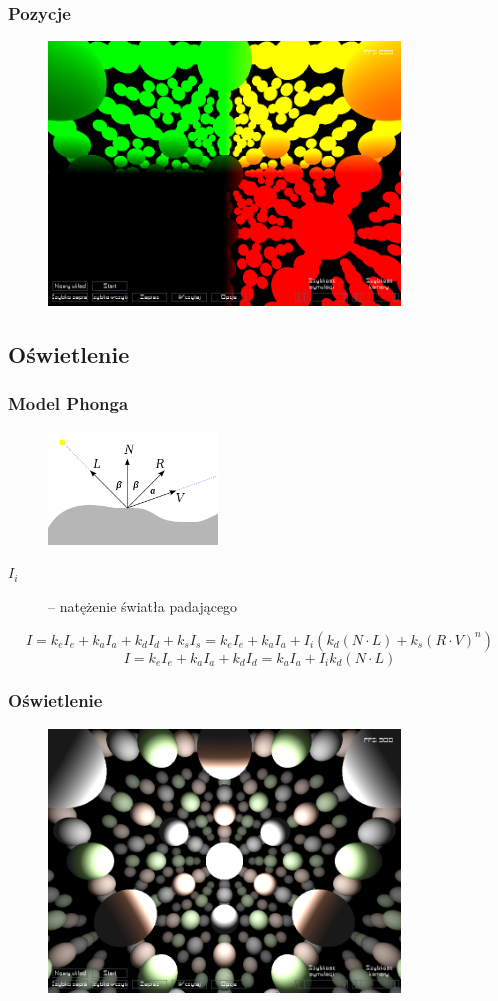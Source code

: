 \documentclass{beamer}
\begin{document}
\frame
{
	\frametitle{Pozycje}
	\begin{figure}
	\centering
		\includegraphics[height=7cm]{img/per3.png}
	\label{fig:per3}
	\end{figure}
	\setcounter{subfigure}{0}
}

\subsection{Oświetlenie}\label{sub:przebieg drugi}

\frame
{
	\frametitle{Model Phonga}

	\begin{figure}
	\centering
		\includegraphics[height=3cm]{img/phong.png}
	\label{fig:phong}
	\end{figure}
	\setcounter{subfigure}{0}
	\begin{description}
	\item[$I_i$] -- natężenie światła padającego
	\end{description}
	$$ I = k_e I_e + k_a I_a + k_d I_d + k_s I_s = k_e I_e + k_a I_a + I_i( k_d( N \cdot L ) + k_s ( R \cdot V )^n ) $$
	\pause $$ I = k_e I_e + k_a I_a + k_d I_d = k_a I_a + I_i k_d( N \cdot L ) $$

}

\frame
{
	\frametitle{Oświetlenie}
	\begin{figure}
	\centering
		\includegraphics[height=7cm]{img/light0.png}
	\label{fig:per2}
	\end{figure}
	\setcounter{subfigure}{0}
}
\end{document}

